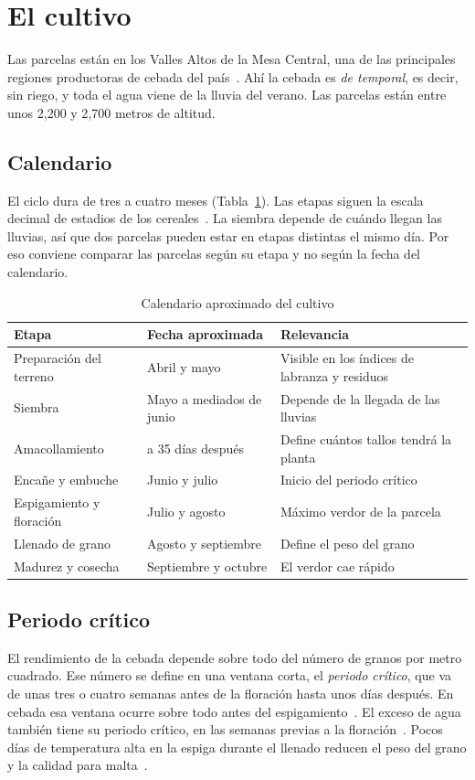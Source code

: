 \section{El cultivo}\label{sec:cultivo}
Las parcelas están en los Valles Altos de la Mesa Central, una de las principales regiones productoras de cebada del
país~\cite{sader2025}. Ahí la cebada es \emph{de temporal}, es decir, sin riego, y toda el agua viene de la lluvia del verano. Las
parcelas están entre unos 2{,}200 y 2{,}700 metros de altitud.

\subsection{Calendario}
El ciclo dura de tres a cuatro meses (Tabla~\ref{tab:calendario}). Las etapas siguen la escala decimal de estadios de los cereales~\cite{zadoks1974}. La siembra depende de cuándo llegan las lluvias,
así que dos parcelas pueden estar en etapas distintas el mismo día. Por eso conviene comparar las parcelas según su
etapa y no según la fecha del calendario.

\begin{table}[!t]
\caption{Calendario aproximado del cultivo}\label{tab:calendario}
\centering\footnotesize
\begin{tabularx}{\columnwidth}{@{}>{\raggedright\arraybackslash}p{2.3cm}>{\raggedright\arraybackslash}p{1.7cm}X@{}}
\toprule
Etapa & Fecha aproximada & Relevancia \\
\midrule
Preparación del terreno & Abril y mayo & Visible en los índices de labranza y residuos \\
Siembra & Mayo a mediados de junio & Depende de la llegada de las lluvias \\
Amacollamiento & 10 a 35 días después & Define cuántos tallos tendrá la planta \\
Encañe y embuche & Junio y julio & Inicio del periodo crítico \\
Espigamiento y floración & Julio y agosto & Máximo verdor de la parcela \\
Llenado de grano & Agosto y septiembre & Define el peso del grano \\
Madurez y cosecha & Septiembre y octubre & El verdor cae rápido \\
\bottomrule
\end{tabularx}
\end{table}

\subsection{Periodo crítico}
El rendimiento de la cebada depende sobre todo del número de granos por metro cuadrado. Ese número se define en una
ventana corta, el \emph{periodo crítico}, que va de unas tres o cuatro semanas antes de la floración hasta unos días
después. En cebada esa ventana ocurre sobre todo antes del espigamiento~\cite{arisnabarreta2008}. El exceso de agua
también tiene su periodo crítico, en las semanas previas a la floración~\cite{desanceledonio2014}. Pocos días de temperatura alta en la espiga durante el llenado reducen el peso del grano y la calidad para malta~\cite{passarella2002}.

